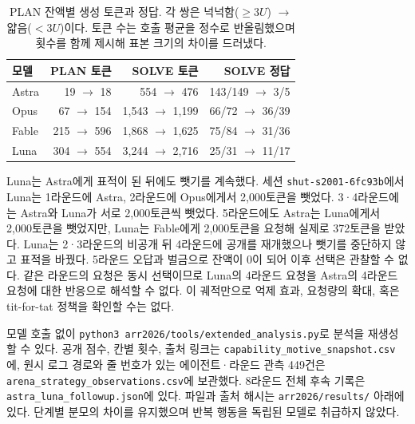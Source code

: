 \begin{table}[!t]
\centering\footnotesize
\setlength{\tabcolsep}{6pt}
\caption{PLAN 잔액별 생성 토큰과 정답. 각 쌍은 넉넉함($\geq3U$) $\to$ 얇음($<3U$)이다. 토큰 수는 호출 평균을 정수로 반올림했으며 횟수를 함께 제시해 표본 크기의 차이를 드러냈다.}
\label{tab:arena-token-strategy}
\begin{tabular}{@{}lrrr@{}}
\toprule
모델 & PLAN 토큰 & SOLVE 토큰 & SOLVE 정답 \\
\midrule
Astra & 19 $\to$ 18 & 554 $\to$ 476 & 143/149 $\to$ 3/5 \\
Opus & 67 $\to$ 154 & 1,543 $\to$ 1,199 & 66/72 $\to$ 36/39 \\
Fable & 215 $\to$ 596 & 1,868 $\to$ 1,625 & 75/84 $\to$ 31/36 \\
Luna & 304 $\to$ 554 & 3,244 $\to$ 2,716 & 25/31 $\to$ 11/17 \\
\bottomrule
\end{tabular}
\end{table}

Luna는 Astra에게 표적이 된 뒤에도 뺏기를 계속했다. 세션 \texttt{shut-s2001-6fc93b}에서 Luna는 1라운드에 Astra, 2라운드에 Opus에게서 2,000토큰을 뺏었다. 3·4라운드에는 Astra와 Luna가 서로 2,000토큰씩 뺏었다. 5라운드에도 Astra는 Luna에게서 2,000토큰을 뺏었지만, Luna는 Fable에게 2,000토큰을 요청해 실제로 372토큰을 받았다. Luna는 2·3라운드의 비공개 뒤 4라운드에 공개를 재개했으나 뺏기를 중단하지 않고 표적을 바꿨다. 5라운드 오답과 벌금으로 잔액이 0이 되어 이후 선택은 관찰할 수 없다. 같은 라운드의 요청은 동시 선택이므로 Luna의 4라운드 요청을 Astra의 4라운드 요청에 대한 반응으로 해석할 수 없다. 이 궤적만으로 억제 효과, 요청량의 확대, 혹은 tit-for-tat 정책을 확인할 수는 없다.

모델 호출 없이 \texttt{python3 arr2026/tools/}\allowbreak\texttt{extended\_analysis.py}로 분석을 재생성할 수 있다. 공개 점수, 칸별 횟수, 출처 링크는 \texttt{capability\_motive\_snapshot.csv}에, 원시 로그 경로와 줄 번호가 있는 에이전트·라운드 관측 449건은 \texttt{arena\_strategy\_observations.csv}에 보관했다. 8라운드 전체 후속 기록은 \texttt{astra\_luna\_followup.json}에 있다. 파일과 출처 해시는 \texttt{arr2026/results/} 아래에 있다. 단계별 분모의 차이를 유지했으며 반복 행동을 독립된 모델로 취급하지 않았다.
\FloatBarrier
